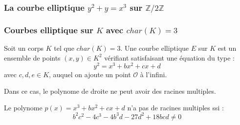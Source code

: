 \documentclass[9pt]{beamer}
\begin{document}
\begin{frame}
    \frametitle{La courbe elliptique $y^2 + y = x^3$ sur $\mathbb{Z}/2\mathbb{Z}$}
    \begin{figure}
    \end{figure}
\end{frame}

\begin{frame}
    \frametitle{Courbes elliptique sur $K$ avec $char(K) = 3$}
    \begin{df}
        Soit un corps $K$ tel que $char(K) = 3$. Une courbe elliptique $E$ sur $K$ est un
        ensemble de points $(x,y) \in K^2$ vérifiant satisfaisant une équation du type :
        \[
            y^2 = x^3 + bx^2 + cx + d
        \]
        avec $c, d, e \in K$, auquel on ajoute un point $\mathcal{O}$ à l'infini.
    \end{df}

    \begin{rmq}
        Dans ce cas, le polynome de droite ne peut avoir des racines multiples.
    \end{rmq}

    \begin{rmq}
        Le polynome $p(x) = x^3 + bx^2 + cx + d$ n'a pas de racines multiples ssi : \[
            b^2c^2 - 4 c^3 - 4b^3d - 27d^2 + 18 bcd \neq 0
        \]
    \end{rmq}
\end{frame}
\end{document}
